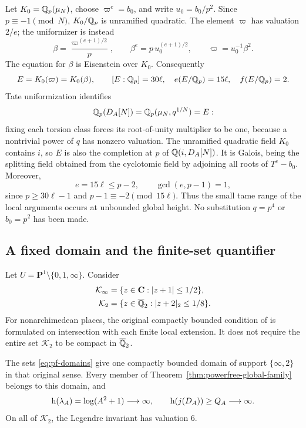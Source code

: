 Let \(K_0=\mathbb Q_p(\mu_N)\), choose \(\varpi^e=b_0\), and write
\(u_0=b_0/p^2\). Since \(p\equiv-1\pmod N\), \(K_0/\mathbb Q_p\) is
unramified quadratic. The element \(\varpi\) has valuation \(2/e\);
the uniformizer is instead
\begin{equation}\label{eq:pf-uniformizer}
 \beta=\frac{\varpi^{(e+1)/2}}p,\qquad
 \beta^e=p\,u_0^{(e+1)/2},\qquad
 \varpi=u_0^{-1}\beta^2.
\end{equation}
The equation for \(\beta\) is Eisenstein over \(K_0\). Consequently
\[
 E=K_0(\varpi)=K_0(\beta),\qquad
 [E:\mathbb Q_p]=30\ell,\quad e(E/\mathbb Q_p)=15\ell,\quad f(E/\mathbb Q_p)=2.
\]
Tate uniformization identifies
\[
 \mathbb Q_p(D_A[N])=\mathbb Q_p(\mu_N,q^{1/N})=E:
\]
fixing each torsion class forces its root-of-unity multiplier to be one,
because a nontrivial power of \(q\) has nonzero valuation.
The unramified quadratic field \(K_0\) contains \(i\), so \(E\) is also
the completion at \(p\) of \(\mathbb Q(i,D_A[N])\).
It is Galois, being the splitting field obtained from the cyclotomic
field by adjoining all roots of \(T^e-b_0\).
Moreover,
\begin{equation}\label{eq:pf-small-tame}
 e=15\ell\le p-2,\qquad \gcd(e,p-1)=1,
\end{equation}
since \(p\ge30\ell-1\) and \(p-1\equiv-2\pmod {15\ell}\).
Thus the small tame range of the local arguments occurs at unbounded
global height. No substitution \(q=p^4\) or \(b_0=p^2\) has been made.

\subsection{A fixed domain and the finite-set quantifier}

Let \(U=\mathbf P^1\setminus\{0,1,\infty\}\). Consider
\begin{equation}\label{eq:pf-domains}
 \begin{split}
  \mathcal K_\infty
     &=\{z\in\mathbf C:|z+1|\le1/2\},\\
  \mathcal K_2
     &=\{z\in\overline{\mathbb Q}_2:|z+2|_2\le1/8\}.
 \end{split}
\end{equation}
For nonarchimedean places, the original compactly bounded condition of
\cite[Example~1.3(ii), author manuscript pp.~5--6]{MochGeneralPosition}
is formulated on intersection with each finite local extension. It does
not require the entire set \(\mathcal K_2\) to be compact in
\(\overline{\mathbb Q}_2\).

\begin{proposition}
\label{prop:powerfree-fixed-domain}
The sets \eqref{eq:pf-domains} give one compactly bounded domain of support
\(\{\infty,2\}\) in that original sense. Every member of
Theorem~\ref{thm:powerfree-global-family} belongs to this domain, and
\begin{equation}\label{eq:pf-unbounded-heights}
 \mathrm h(\lambda_A)=\log(A^2+1)\longrightarrow\infty,\qquad
 \mathrm h(j(D_A))\ge Q_A\longrightarrow\infty.
\end{equation}
On all of \(\mathcal K_2\), the Legendre invariant has valuation 6.
\end{proposition}


